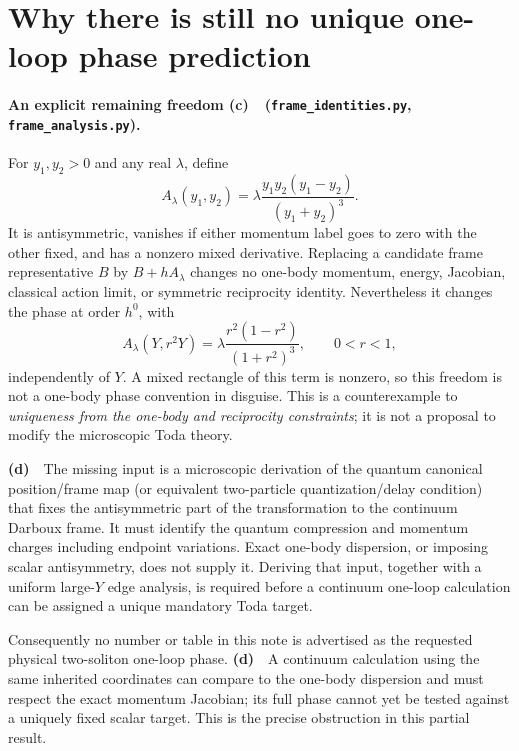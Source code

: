\documentclass[11pt,a4paper]{article}
\newcommand{\Lc}{\textbf{(c)}\ }
\newcommand{\Ld}{\textbf{(d)}\ }
\newcommand{\id}{\texttt{frame\_\allowbreak identities.py}}
\newcommand{\an}{\texttt{frame\_\allowbreak analysis.py}}
\begin{document}
\section{Why there is still no unique one-loop phase prediction}
\paragraph{An explicit remaining freedom \Lc\ (\id, \an).}
For $y_1,y_2>0$ and any real $\lambda$, define
\begin{equation}
 A_\lambda(y_1,y_2)=\lambda\frac{y_1y_2(y_1-y_2)}{(y_1+y_2)^3}.
 \label{eq:ambiguity}
\end{equation}
It is antisymmetric, vanishes if either momentum label goes to zero with
the other fixed, and has a nonzero mixed derivative. Replacing a candidate
frame representative $B$ by $B+hA_\lambda$ changes no one-body momentum,
energy, Jacobian, classical action limit, or symmetric reciprocity identity.
Nevertheless it changes the phase at order $h^0$, with
\begin{equation}
 A_\lambda(Y,r^2Y)=\lambda\frac{r^2(1-r^2)}{(1+r^2)^3},\qquad 0<r<1,
 \label{eq:ambiguitylimit}
\end{equation}
independently of $Y$. A mixed rectangle of this term is nonzero, so this
freedom is not a one-body phase convention in disguise.
This is a counterexample to \emph{uniqueness from the one-body and reciprocity
constraints}; it is not a proposal to modify the microscopic Toda theory.

\Ld\ The missing input is a microscopic derivation of the quantum canonical
position/frame map (or equivalent two-particle quantization/delay condition)
that fixes the antisymmetric part of the transformation to the continuum
Darboux frame. It must identify the quantum compression and momentum charges
including endpoint variations. Exact one-body dispersion, or imposing scalar
antisymmetry, does not supply it. Deriving that input, together with a uniform
large-$Y$ edge analysis, is required before a continuum one-loop calculation
can be assigned a unique mandatory Toda target.

Consequently no number or table in this note is advertised as the requested
physical two-soliton one-loop phase. \Ld\ A continuum calculation using the
same inherited coordinates can compare to the one-body dispersion and must
respect the exact momentum Jacobian; its full phase cannot yet be tested
against a uniquely fixed scalar target. This is the precise obstruction in
this partial result.
\end{document}
